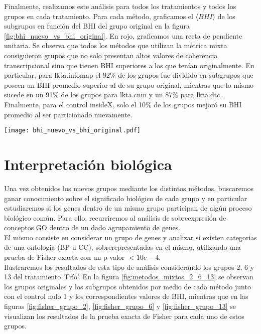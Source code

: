 Finalmente, realizamos este análisis para todos los tratamientos y todos los grupos en cada tratamiento. Para cada método, graficamos el $\langle BHI \rangle$ de los subgrupos en función del BHI del grupo original en la figura \ref{fig:bhi_nuevo_vs_bhi_original}. En rojo, graficamos una recta de pendiente unitaria. Se observa que todos los métodos que utilizan la métrica mixta consiguieron grupos que no solo presentan altos valores de coherencia transcripcional sino que tienen BHI superiores a los que tenían originalmente. En particular, para lkta.infomap el 92\% de los grupos fue dividido en subgrupos que poseen un BHI promedio superior al de su grupo original, mientras que lo mismo sucede en un 91\% de los grupos para lkta.cnm y un 87\% para lkta.dtc. Finalmente, para el control insideX, solo el 10\% de los grupos mejoró su BHI promedio al ser particionado nuevamente.
\begin{center}
\texttt{[image: bhi\_nuevo\_vs\_bhi\_original.pdf]}
\label{fig:bhi_nuevo_vs_bhi_original}
\end{center}
\section{Interpretación biológica}
Una vez obtenidos los nuevos grupos mediante los distintos métodos, buscaremos ganar conocimiento sobre el significado biológico de cada grupo y en particular estudiaremos si los genes dentro de un mismo grupo participan de algún proceso biológico común. Para ello, recurriremos al análisis de sobreexpresión de conceptos GO dentro de un dado agrupamiento de genes.\\
El mismo consiste en considerar un grupo de genes y analizar si existen categorias de una ontologia (BP u CC), sobrerepresentadas en el mismo, utilizando una prueba de Fisher exacta con un p-valor $<10e-4$.\\
Ilustraremos los resultados de esta tipo de análisis considerando los grupos 2, 6 y 13 del tratamiento 'Frío'. En la figura \ref{fig:metodos_mixtos_2_6_13} se observan los grupos originales y los subgrupos obtenidos por medio de cada método junto con el control nulo 1 y los correspondientes valores de BHI, mientras que en las figuras \ref{fig:fisher_grupo_2}, \ref{fig:fisher_grupo_6} y \ref{fig:fisher_grupo_13} se visualizan los resultados de la prueba exacta de Fisher para cada uno de estos grupos. 

